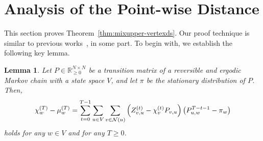 \documentclass[letter, 11pt]{article}
\newcommand{\1}{\mbox{1}\hspace{-0.25em}\mbox{l}}
\newtheorem{lemma}[theorem]{Lemma}
\begin{document}
\section{Analysis of the Point-wise Distance}\label{sec:main}
This section proves Theorem~\ref{thm:mixupper-vertexds}. 
 Our proof technique is similar to previous works~\cite{CS06, KKM12, RSW98}, in some part. 
To begin with, we establish the following key lemma. 
\begin{lemma}
\label{lemm:maindisc}
 Let $P \in \mathbb{R}_{\geq 0}^{N \times N}$ be a transition matrix of 
  a reversible and ergodic Markov chain with a state space $V$, 
  and let $\pi$ be the stationary distribution of $P$. 
Then, 
\begin{eqnarray*}
\chi ^{(T)}_w-\mu ^{(T)}_w=\sum_{t=0}^{T-1}\sum_{u\in V}\sum_{v\in {\cal N}(u)}\left( Z^{(t)}_{v, u}-\chi^{(t)}_v P_{v, u}\right) \left( P^{T-t-1}_{u, w}-\pi_{w} \right) 
\end{eqnarray*}
holds for any $w\in V$ and for any $T\geq 0$.
\end{lemma}
\end{document}
